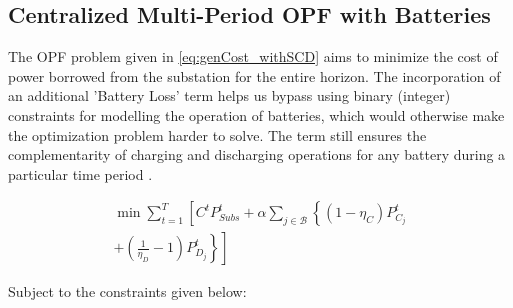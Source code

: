 \documentclass[../../outputs/main.tex]{subfiles}
\begin{document}
\subsection{Centralized Multi-Period OPF with Batteries}
The OPF problem given in \cref{eq:genCost_withSCD} aims to minimize the cost of power borrowed from the substation for the entire horizon. The incorporation of an additional 'Battery Loss' term helps us bypass using binary (integer) constraints for modelling the operation of batteries, which would otherwise make the optimization problem harder to solve. The term still ensures the complementarity of charging and discharging operations for any battery during a particular time period \cite{Nazir2018Jun, Nazir2019Jun, Nazir2021Sep}.

\begin{equation}
    \begin{split}
        \min \sum_{t = 1}^{T} \left[ C^t P^t_{Subs} + \alpha \sum_{j \in \mathcal{B}} \left\{ (1-\eta_C)P^t_{C_j} \right. \right. \\
        \left. \left. + \left( \frac{1}{\eta_D} - 1 \right) P^t_{D_j} \right\} \right]
    \end{split}
    \label{eq:genCost_withSCD}
\end{equation}


Subject to the constraints  given below:
\end{document}
